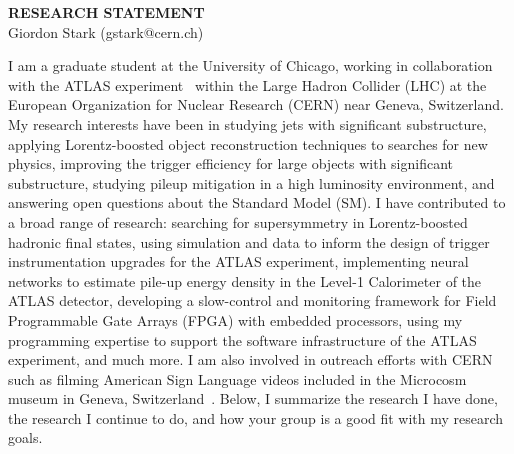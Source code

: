 \documentclass[letterpaper, 10pt]{article}
\begin{document}
\thispagestyle{fancy}
\lhead{}
\rhead{}
\renewcommand{\headrulewidth}{0pt}
\renewcommand{\footrulewidth}{0pt}

\pagestyle{fancy}
\lhead{\textcolor{gray}{\it Giordon Stark}}
\rhead{\textcolor{gray}{\thepage/\totalpages{}}}

\begin{center}
{\LARGE \bf RESEARCH STATEMENT}\\
\vspace*{0.1cm}
{\normalsize Giordon Stark (gstark@cern.ch)}
\end{center}

I am a graduate student at the University of Chicago, working in collaboration with the ATLAS experiment~ within the Large Hadron Collider (LHC) at the European Organization for Nuclear Research (CERN) near Geneva, Switzerland. My research interests have been in studying jets with significant substructure, applying Lorentz-boosted object reconstruction techniques to searches for new physics, improving the trigger efficiency for large objects with significant substructure, studying pileup mitigation in a high luminosity environment, and answering open questions about the Standard Model (SM). I have contributed to a broad range of research: searching for supersymmetry in Lorentz-boosted hadronic final states, using simulation and data to inform the design of trigger instrumentation upgrades for the ATLAS experiment, implementing neural networks to estimate pile-up energy density in the Level-1 Calorimeter of the ATLAS detector, developing a slow-control and monitoring framework for Field Programmable Gate Arrays (FPGA) with embedded processors, using my programming expertise to support the software infrastructure of the ATLAS experiment, and much more. I am also involved in outreach efforts with CERN such as filming American Sign Language videos included in the Microcosm museum in Geneva, Switzerland~. Below, I summarize the research I have done, the research I continue to do, and how your group is a good fit with my research goals.

\end{document}
